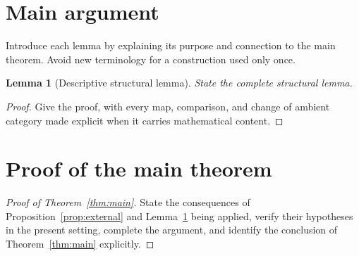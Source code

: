 \documentclass[11pt]{article}
\newtheorem{lemma}[theorem]{Lemma}
\theoremstyle{definition}
\begin{document}
\section{Main argument}

Introduce each lemma by explaining its purpose and connection to the main
theorem. Avoid new terminology for a construction used only once.

\begin{lemma}[Descriptive structural lemma]\label{lem:structural}
State the complete structural lemma.
\end{lemma}

\begin{proof}
Give the proof, with every map, comparison, and change of ambient category made
explicit when it carries mathematical content.
\end{proof}

\section{Proof of the main theorem}

\begin{proof}[Proof of Theorem~\ref{thm:main}]
State the consequences of Proposition~\ref{prop:external} and
Lemma~\ref{lem:structural} being applied, verify their hypotheses in the
present setting, complete the argument, and identify the conclusion of
Theorem~\ref{thm:main} explicitly.
\end{proof}

\end{document}
